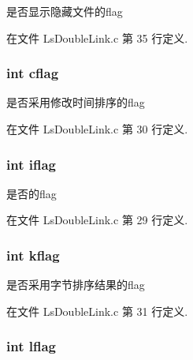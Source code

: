 是否显示隐藏文件的flag 



在文件 Ls\-Double\-Link.\-c 第 35 行定义.

\hypertarget{structglobal_args__t_afbb9b1dda8ad9915e753c7a84be13489}{
\subsubsection[{cflag}]{\setlength{\rightskip}{0pt plus 5cm}int cflag}}\label{structglobal_args__t_afbb9b1dda8ad9915e753c7a84be13489}


是否采用修改时间排序的flag 



在文件 Ls\-Double\-Link.\-c 第 30 行定义.

\hypertarget{structglobal_args__t_ad532de65ced2a7f637c0cfa3a6e7e993}{
\subsubsection[{iflag}]{\setlength{\rightskip}{0pt plus 5cm}int iflag}}\label{structglobal_args__t_ad532de65ced2a7f637c0cfa3a6e7e993}


是否的flag 



在文件 Ls\-Double\-Link.\-c 第 29 行定义.

\hypertarget{structglobal_args__t_ae2586d61cfd83f6d8ee1777eb20b54b0}{
\subsubsection[{kflag}]{\setlength{\rightskip}{0pt plus 5cm}int kflag}}\label{structglobal_args__t_ae2586d61cfd83f6d8ee1777eb20b54b0}


是否采用字节排序结果的flag 



在文件 Ls\-Double\-Link.\-c 第 31 行定义.

\hypertarget{structglobal_args__t_a4cc7e6867b564ffab9f569351d574a67}{
\subsubsection[{lflag}]{\setlength{\rightskip}{0pt plus 5cm}int lflag}}\label{structglobal_args__t_a4cc7e6867b564ffab9f569351d574a67}


